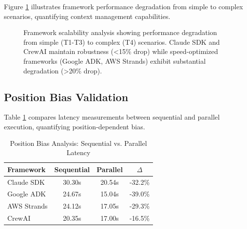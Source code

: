 \documentclass[sigconf,nonacm]{acmart}
\begin{document}
Figure \ref{fig:scalability} illustrates framework performance degradation from simple to complex scenarios, quantifying context management capabilities.

\begin{figure}[!htbp]
\centering
{}
\caption{Framework scalability analysis showing performance degradation from simple (T1-T3) to complex (T4) scenarios. Claude SDK and CrewAI maintain robustness (<15\% drop) while speed-optimized frameworks (Google ADK, AWS Strands) exhibit substantial degradation (>20\% drop).}
\label{fig:scalability}
\end{figure}

\subsection{Position Bias Validation}

Table \ref{tab:position-bias} compares latency measurements between sequential and parallel execution, quantifying position-dependent bias.

\begin{table}[h]
\caption{Position Bias Analysis: Sequential vs. Parallel Latency}
\label{tab:position-bias}
\begin{tabular}{lccc}
\toprule
\textbf{Framework} & \textbf{Sequential} & \textbf{Parallel} & \textbf{$\Delta$} \\
\midrule
Claude SDK & 30.30s & 20.54s & -32.2\% \\
Google ADK & 24.67s & 15.04s & -39.0\% \\
AWS Strands & 24.12s & 17.05s & -29.3\% \\
CrewAI & 20.35s & 17.00s & -16.5\% \\
\bottomrule
\end{tabular}
\end{table}
\end{document}
